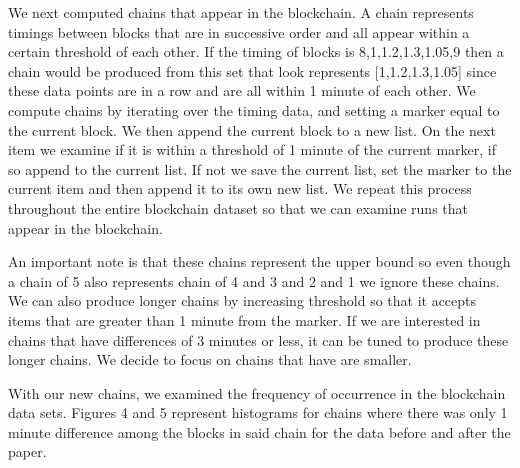 \documentclass{sig-alternate-05-2015}
\begin{document}
We next computed chains that appear in the blockchain. A chain represents timings between blocks that are in successive order and all appear within a certain threshold of each other. If the timing of blocks is 8,1,1.2,1.3,1.05,9 then a chain would be produced from this set that look represents [1,1.2,1.3,1.05] since these data points are in a row and are all within 1 minute of each other. We compute chains by iterating over the timing data, and setting a marker equal to the current block. We then append the current block to a new list. On the next item we examine if it is within a threshold of 1 minute of the current marker, if so append to the current list. If not we save the current list, set the marker to the current item and then append it to its own new list. We repeat this process throughout the entire blockchain dataset so that we can examine runs that appear in the blockchain. 

An important note is that these chains represent the upper bound so even though a chain of 5 also represents chain of 4 and 3 and 2 and 1 we ignore these chains. We can also produce longer chains by increasing threshold so that it accepts items that are greater than 1 minute from the marker. If we are interested in chains that have differences of 3 minutes or less, it can be tuned to produce these longer chains. We decide to focus on chains that have are smaller.    

With our new chains, we examined the frequency of occurrence in the blockchain data sets. Figures 4 and 5 represent histograms for chains where there was only 1 minute difference among the blocks in said chain for the data before and after the paper.
\end{document}
